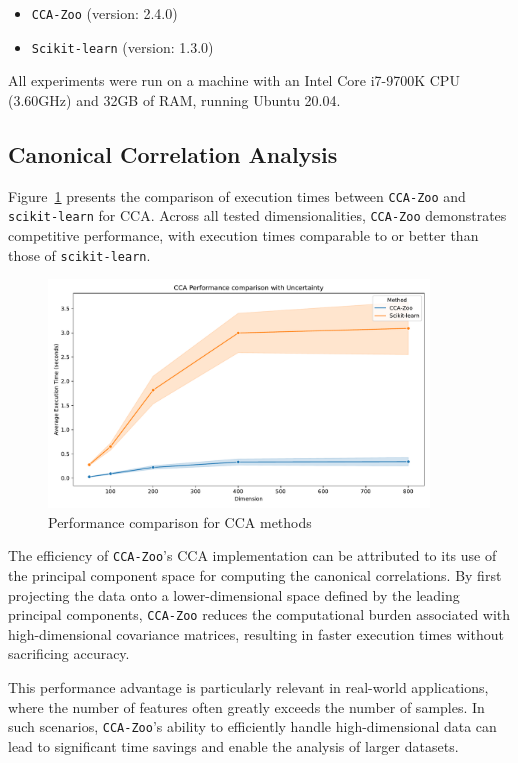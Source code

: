 \begin{itemize}
\item \texttt{CCA-Zoo} (version: 2.4.0)
\item \texttt{Scikit-learn} (version: 1.3.0)
\end{itemize}

All experiments were run on a machine with an Intel Core i7-9700K CPU (3.60GHz) and 32GB of RAM, running Ubuntu 20.04.

\subsection{Canonical Correlation Analysis}

Figure~\ref{fig:cca_benchmark} presents the comparison of execution times between \texttt{CCA-Zoo} and \texttt{scikit-learn} for CCA. Across all tested dimensionalities, \texttt{CCA-Zoo} demonstrates competitive performance, with execution times comparable to or better than those of \texttt{scikit-learn}.

\begin{figure}[h]
\centering
\includegraphics[width=0.9\textwidth]{figures/CCA_Speed_Benchmark}
\caption{Performance comparison for CCA methods}
\label{fig:cca_benchmark}
\end{figure}

The efficiency of \texttt{CCA-Zoo}'s CCA implementation can be attributed to its use of the principal component space for computing the canonical correlations. By first projecting the data onto a lower-dimensional space defined by the leading principal components, \texttt{CCA-Zoo} reduces the computational burden associated with high-dimensional covariance matrices, resulting in faster execution times without sacrificing accuracy.

This performance advantage is particularly relevant in real-world applications, where the number of features often greatly exceeds the number of samples. In such scenarios, \texttt{CCA-Zoo}'s ability to efficiently handle high-dimensional data can lead to significant time savings and enable the analysis of larger datasets.


